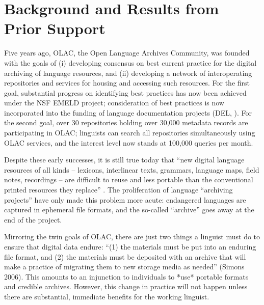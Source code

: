 \section{Background and Results from Prior Support}

Five years ago, OLAC, the Open Language Archives Community, was
founded with the goals of (i) developing consensus on best current
practice for the digital archiving of language resources, and (ii)
developing a network of interoperating repositories and services for
housing and accessing such resources.  For the first goal, substantial
progress on identifying best practices has now been achieved under the
NSF EMELD project; consideration of best practices is now incorporated
into the funding of language documentation projects (DEL,
\citet{BirdSimons03language}).  For the second goal, over 30 repositories
holding over 30,000 metadata records are participating in OLAC;
linguists can search all repositories simultaneously using OLAC
services, and the interest level now stands at 100,000 queries per
month.

Despite these early successes, it is still true today that ``new
digital language resources of all kinds -- lexicons, interlinear
texts, grammars, language maps, field notes, recordings -- are
difficult to reuse and less portable than the conventional printed
resources they replace'' \citep{BirdSimons03language}.  The proliferation of
language ``archiving projects'' have only made this problem more
acute: endangered languages are captured in ephemeral file formats,
and the so-called ``archive'' goes away at the end of the project.

Mirroring the twin goals of OLAC, there are just two things a linguist
must do to ensure that digital data endure: ``(1) the materials must be
put into an enduring file format, and (2) the materials must be
deposited with an archive that will make a practice of migrating them
to new storage media as needed'' (Simons 2006).  This amounts to an
injunction to individuals to *use* portable formats and credible
archives.  However, this change in practice will not happen unless
there are substantial, immediate benefits for the working linguist.

\vspace{1in}


